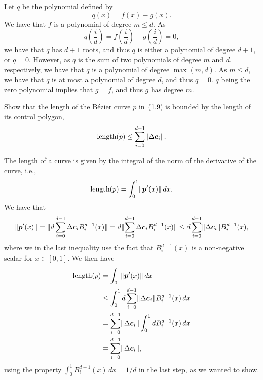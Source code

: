 \begin{solution}
    Let $q$ be the polynomial defined by
    \begin{equation*}
        q(x) = f(x) - g(x).
    \end{equation*}
    We have that $f$ is a polynomial of degree $m \leq d$.
    As
    \begin{equation*}
        q\left(\frac{i}{d}\right) = f\left(\frac{i}{d}\right) - g\left(\frac{i}{d}\right) = 0,
    \end{equation*}
    we have that $q$ has $d+1$ roots, and thus $q$ is either a polynomial of degree $d+1$, or $q = 0$.
    However, as $q$ is the sum of two polynomials of degree $m$ and $d$, respectively, we have that $q$ is a polynomial of degree $\max(m, d)$.
    As $m \leq d$, we have that $q$ is at most a polynomial of degree $d$, and thus $q = 0$.
    $q$ being the zero polynomial implies that $g = f$, and thus $g$ has degree $m$.
\end{solution}

\begin{exercise}
    Show that the length of the Bézier curve $p$ in~(1.9) is bounded by the length of its control polygon,
    \begin{equation*}
        \text{length}(p) \leq \sum_{i = 0}^{d-1} \lVert\Delta \boldsymbol{c}_i\rVert.
    \end{equation*}
\end{exercise}

\begin{solution}
    The length of a curve is given by the integral of the norm of the derivative of the curve, i.e.,
    \begin{equation*}
        \text{length}(p) = \int_0^1 \lVert \boldsymbol{p}'(x)\rVert \, dx.
    \end{equation*}
    We have that
    \begin{equation*}
        \lVert\boldsymbol{p}'(x)\rVert = \lVert d \sum_{i = 0}^{d-1} \Delta \boldsymbol{c}_i B_i^{d-1}(x)\rVert
        = d \lVert\sum_{i = 0}^{d-1} \Delta \boldsymbol{c}_i B_i^{d-1}(x)\rVert
        \leq d \sum_{i = 0}^{d-1} \lVert\Delta \boldsymbol{c}_i\rVert B_i^{d-1}(x),
    \end{equation*}
    where we in the last inequality use the fact that $B_{i}^{d-1}(x)$ is a non-negative scalar for $x \in [0, 1]$.
    We then have
    \begin{align*}
        \text{length}(p)
        &= \int_0^1 \lVert\boldsymbol{p}'(x)\rVert  \, dx \\
        &\leq \int_0^1 d \sum_{i = 0}^{d-1} \lVert\Delta \boldsymbol{c}_i\rVert B_{i}^{d-1} (x) \, dx \\
        &= \sum_{i = 0}^{d-1} \lVert\Delta \boldsymbol{c}_i\rVert \int_0^1 d B_{i}^{d-1} (x) \, dx \\
        &= \sum_{i = 0}^{d-1} \lVert\Delta \boldsymbol{c}_i\rVert,
    \end{align*}
    using the property $\int_0^1 B_i^{d-1}(x) \, dx = 1 / d$ in the last step, as we wanted to show.
\end{solution}